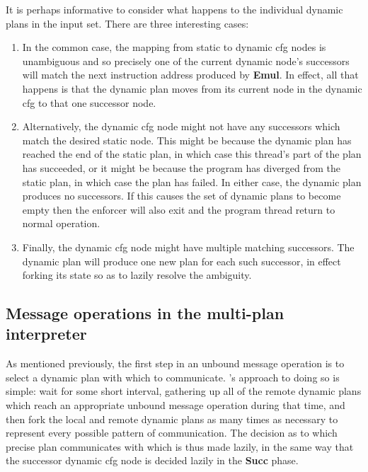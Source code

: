 It is perhaps informative to consider what happens to the individual
dynamic plans in the input set.  There are three interesting cases:
\begin{enumerate}
\item In the common case, the mapping from static to \gls{dynamic cfg}
  nodes is unambiguous and so precisely one of the current dynamic
  node's successors will match the next instruction address produced
  by \textbf{Emul}.  In effect, all that happens is that the dynamic
  plan moves from its current node in the dynamic \gls{cfg} to that
  one successor node.

\item Alternatively, the dynamic \gls{cfg} node might not have any
  successors which match the desired static node.  This might be
  because the dynamic plan has reached the end of the static plan, in
  which case this thread's part of the plan has succeeded, or it might
  be because the program has diverged from the static plan, in which
  case the plan has failed.  In either case, the dynamic plan produces
  no successors.  If this causes the set of dynamic plans to become
  empty then the enforcer will also exit and the program thread return
  to normal operation.

\item Finally, the \gls{dynamic cfg} node might have multiple matching
  successors.  The dynamic plan will produce one new plan for each
  such successor, in effect forking its state so as to lazily resolve
  the ambiguity.
\end{enumerate}

\subsection{Message operations in the multi-plan interpreter}
\label{sect:enforce:hli_messages}

  As mentioned previously,
the first step in an unbound message operation is to select a dynamic
plan with which to communicate.  {\Technique}'s approach to doing so
is simple: wait for some short interval, gathering up all of the
remote dynamic plans which reach an appropriate unbound message
operation during that time, and then fork the local and remote dynamic
plans as many times as necessary to represent every possible pattern
of communication.  The decision as to which precise plan communicates
with which is thus made lazily, in the same way that the successor
\gls{dynamic cfg} node is decided lazily in the \textbf{Succ} phase.

